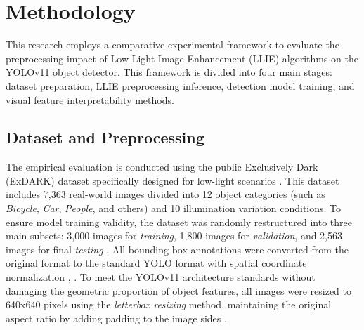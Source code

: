 \documentclass[conference]{IEEEtran}
\begin{document}

\section{Methodology}
This research employs a comparative experimental framework to evaluate the preprocessing impact of Low-Light Image Enhancement (LLIE) algorithms on the YOLOv11 object detector. This framework is divided into four main stages: dataset preparation, LLIE preprocessing inference, detection model training, and visual feature interpretability methods.

\subsection{Dataset and Preprocessing} The empirical evaluation is conducted using the public Exclusively Dark (ExDARK) dataset specifically designed for low-light scenarios \cite{loh2019exdark}. This dataset includes 7,363 real-world images divided into 12 object categories (such as \textit{Bicycle}, \textit{Car}, \textit{People}, and others) and 10 illumination variation conditions. To ensure model training validity, the dataset was randomly restructured into three main subsets: 3,000 images for \textit{training}, 1,800 images for \textit{validation}, and 2,563 images for final \textit{testing} \cite{proposal2026sempro}.
All bounding box annotations were converted from the original format to the standard YOLO format with spatial coordinate normalization \cite{padilla2021metrics}, \cite{proposal2026sempro}. To meet the YOLOv11 architecture standards without damaging the geometric proportion of object features, all images were resized to 640x640 pixels using the \textit{letterbox resizing} method, maintaining the original aspect ratio by adding padding to the image sides \cite{proposal2026sempro}.
\end{document}
